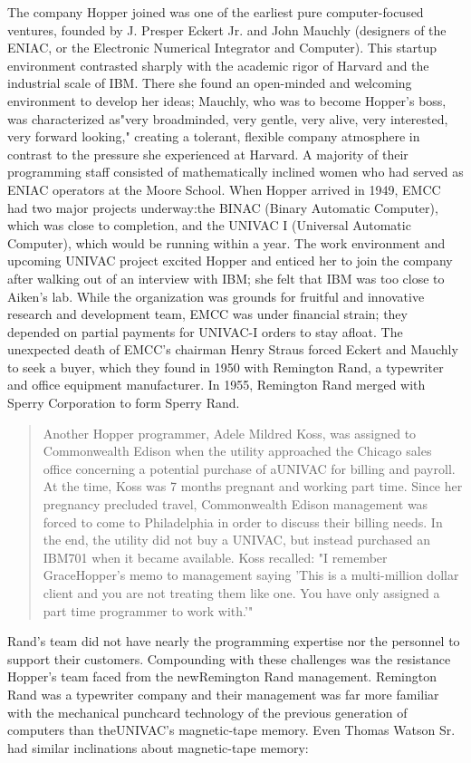 The company Hopper joined was one of the earliest pure computer-focused
ventures, founded by J. Presper Eckert Jr. and John Mauchly (designers of the
ENIAC, or the Electronic Numerical Integrator and Computer). This startup
environment contrasted sharply with the academic rigor of Harvard and the
industrial scale of IBM. There she found an open-minded and welcoming
environment to develop her ideas; Mauchly, who was to become Hopper's boss, was
characterized as"very broadminded, very gentle, very alive, very interested,
very forward looking,"
\cite{grace_hopper_and_the_invention_of_the_information_age_2009} creating a
tolerant, flexible company atmosphere in contrast to the pressure she
experienced at Harvard. A majority of their programming staff consisted of
mathematically inclined women who had served as ENIAC operators at the Moore
School. When Hopper arrived in 1949, EMCC had two major projects underway:the
BINAC (Binary Automatic Computer), which was close to completion, and the UNIVAC
I (Universal Automatic Computer), which would be running within a year. The work
environment and upcoming UNIVAC project excited Hopper and enticed her to join
the company after walking out of an interview with IBM; she felt that IBM was
too close to Aiken's lab. While the organization was grounds for fruitful and
innovative research and development team, EMCC was under financial strain; they
depended on partial payments for UNIVAC-I orders to stay afloat. The unexpected
death of EMCC's chairman Henry Straus forced Eckert and Mauchly to seek a
buyer, which they found in 1950 with Remington Rand, a typewriter and office
equipment manufacturer. In 1955, Remington Rand merged with Sperry Corporation
to form Sperry Rand.

\begin{quotation}
	Another Hopper programmer, Adele Mildred Koss, was assigned to Commonwealth
	Edison when the utility approached the Chicago sales office concerning a
	potential purchase of aUNIVAC for billing and payroll. At the time, Koss was 7
	months pregnant and working part time. Since her pregnancy precluded travel,
	Commonwealth Edison management was forced to come to Philadelphia in order to
	discuss their billing needs. In the end, the utility did not buy a UNIVAC, but
	instead purchased an IBM701 when it became available. Koss recalled: "I
	remember GraceHopper's memo to management saying 'This is a
	multi-million dollar
	client and you are not treating them like one. You have only assigned a part
	time programmer to work with.'"
	\cite[Adele Mildred Koss, interviewed by Kathy
		Kleiman]{grace_hopper_and_the_invention_of_the_information_age_2009}
\end{quotation}
Rand's team did not have nearly the programming expertise nor the personnel to
support their customers. Compounding with these challenges was the resistance
Hopper's team faced from the newRemington Rand management. Remington Rand was a
typewriter company and their management was far more familiar with the
mechanical punchcard technology of the previous generation of computers than
theUNIVAC's magnetic-tape memory. Even Thomas Watson Sr. had similar
inclinations about magnetic-tape memory:


